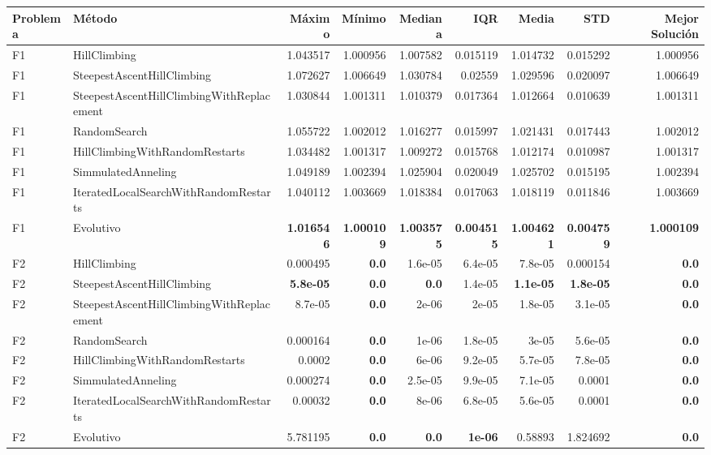 \begin{tabular}{llrrrrrrr}
\toprule
Problema & Método & Máximo & Mínimo & Mediana & IQR & Media & STD & Mejor Solución \\ 
\midrule
F1 & HillClimbing & 1.043517 & 1.000956 & 1.007582 & 0.015119 & 1.014732 & 0.015292 & 1.000956 \\ 
F1 & SteepestAscentHillClimbing & 1.072627 & 1.006649 & 1.030784 & 0.02559 & 1.029596 & 0.020097 & 1.006649 \\ 
F1 & SteepestAscentHillClimbingWithReplacement & 1.030844 & 1.001311 & 1.010379 & 0.017364 & 1.012664 & 0.010639 & 1.001311 \\ 
F1 & RandomSearch & 1.055722 & 1.002012 & 1.016277 & 0.015997 & 1.021431 & 0.017443 & 1.002012 \\ 
F1 & HillClimbingWithRandomRestarts & 1.034482 & 1.001317 & 1.009272 & 0.015768 & 1.012174 & 0.010987 & 1.001317 \\ 
F1 & SimmulatedAnneling & 1.049189 & 1.002394 & 1.025904 & 0.020049 & 1.025702 & 0.015195 & 1.002394 \\ 
F1 & IteratedLocalSearchWithRandomRestarts & 1.040112 & 1.003669 & 1.018384 & 0.017063 & 1.018119 & 0.011846 & 1.003669 \\ 
F1 & Evolutivo & \textbf{1.016546} & \textbf{1.000109} & \textbf{1.003575} & \textbf{0.004515} & \textbf{1.004621} & \textbf{0.004759} & \textbf{1.000109} \\ 
\midrule
F2 & HillClimbing & 0.000495 & \textbf{0.0} & 1.6e-05 & 6.4e-05 & 7.8e-05 & 0.000154 & \textbf{0.0} \\ 
F2 & SteepestAscentHillClimbing & \textbf{5.8e-05} & \textbf{0.0} & \textbf{0.0} & 1.4e-05 & \textbf{1.1e-05} & \textbf{1.8e-05} & \textbf{0.0} \\ 
F2 & SteepestAscentHillClimbingWithReplacement & 8.7e-05 & \textbf{0.0} & 2e-06 & 2e-05 & 1.8e-05 & 3.1e-05 & \textbf{0.0} \\ 
F2 & RandomSearch & 0.000164 & \textbf{0.0} & 1e-06 & 1.8e-05 & 3e-05 & 5.6e-05 & \textbf{0.0} \\ 
F2 & HillClimbingWithRandomRestarts & 0.0002 & \textbf{0.0} & 6e-06 & 9.2e-05 & 5.7e-05 & 7.8e-05 & \textbf{0.0} \\ 
F2 & SimmulatedAnneling & 0.000274 & \textbf{0.0} & 2.5e-05 & 9.9e-05 & 7.1e-05 & 0.0001 & \textbf{0.0} \\ 
F2 & IteratedLocalSearchWithRandomRestarts & 0.00032 & \textbf{0.0} & 8e-06 & 6.8e-05 & 5.6e-05 & 0.0001 & \textbf{0.0} \\ 
F2 & Evolutivo & 5.781195 & \textbf{0.0} & \textbf{0.0} & \textbf{1e-06} & 0.58893 & 1.824692 & \textbf{0.0} \\ 

\end{tabular}
